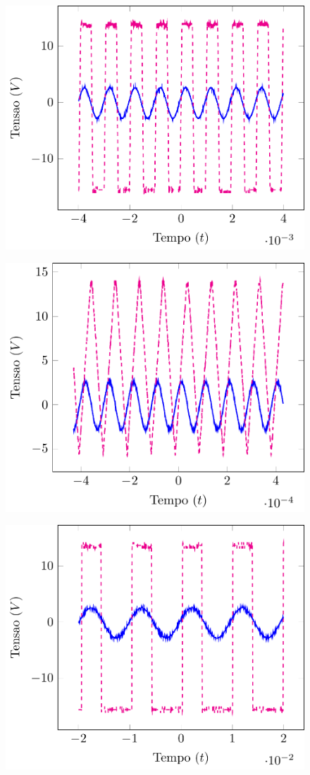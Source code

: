 \documentclass[12pt,a4paper]{article}
\begin{document}
\begin{figure}[htpb]
  \centering
  \includegraphics[width=0.8\linewidth]{./img/5V_1K.pdf}
  \label{5V1K}
\end{figure}
\begin{figure}[htpb]
  \centering
  \includegraphics[width=0.8\linewidth]{./img/5V_100K.pdf}
  \label{5V100k.pdf}
\end{figure}
\begin{figure}[htpb]
  \centering
  \includegraphics[width=0.8\linewidth]{./img/1V_100.pdf}
  \label{1V100}
\end{figure}
\end{document}
